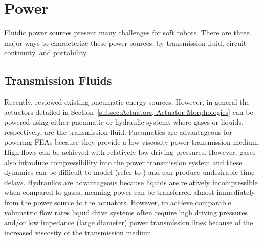 \section{Power}
\label{sec:Power}
Fluidic power sources present many challenges for soft robots.
There are three major ways to characterize these power sources: by transmission fluid, circuit continuity, and portability.

\subsection{Transmission Fluids}
Recently, \citet{wehner2014pneumatic} reviewed existing pneumatic energy sources.
However, in general the actuators detailed in Section~\ref{subsec:Actuators, Actuator Morphologies} can be powered using either pneumatic or hydraulic systems where gases or liquids, respectively, are the transmission fluid.
Pneumatics are advantageous for powering FEAs because they provide a low viscosity power transmission medium.
High flows can be achieved with relatively low driving pressures.
However, gases also introduce compressibility into the power transmission system and these dynamics can be difficult to model (refer to \citet{marchese2015control}) and can produce undesirable time delays.
Hydraulics are advantageous because liquids are relatively incompressible when compared to gases, meaning power can be transferred almost immediately from the power source to the actuators.
However, to achieve comparable volumetric flow rates liquid drive systems often require high driving pressures and/or low impedance (large diameter) power transmission lines because of the increased viscosity of the transmission medium.

